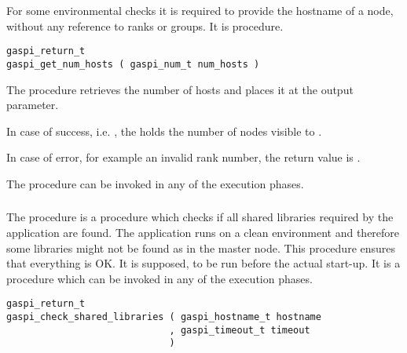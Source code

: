 For some environmental checks it is required to provide the hostname
of a node, without any reference to ranks or groups. It is
  procedure.

\begin{FDef}
\begin{FDefSign}
\begin{verbatim}
gaspi_return_t
gaspi_get_num_hosts ( gaspi_num_t num_hosts )
\end{verbatim}
\end{FDefSign}
\parameterlistbegin
{}
\parameterlistend
\FStdRetDescNOTimeout
\end{FDef}

The procedure  retrieves the number of
hosts and places it at
the  output parameter.

In case of success, i.e. \GASPISUCC{}, the  holds
the number of nodes visible to \GASPI{}.

In case of error, for example an invalid rank number, the return value
is \GASPIGERR{}.

The procedure can be invoked in any of the \GASPI{} execution phases.

\subsubsection{}

The  procedure is a
  procedure which checks if all shared
libraries required by the application are found. The application runs
on a clean environment and therefore some libraries might not be found
as in the master node. This procedure ensures that everything is OK.
It is supposed, to be run before the actual \GASPI{} start-up.
It is a procedure
which can be invoked in any of the \GASPI{} execution phases.

\begin{FDef}
\begin{FDefSign}
\begin{verbatim}
gaspi_return_t
gaspi_check_shared_libraries ( gaspi_hostname_t hostname
                             , gaspi_timeout_t timeout
                             )
\end{verbatim}
\end{FDefSign}
\parameterlistbegin
{}
\parameterlistend
\FStdRetDesc
\end{FDef}

